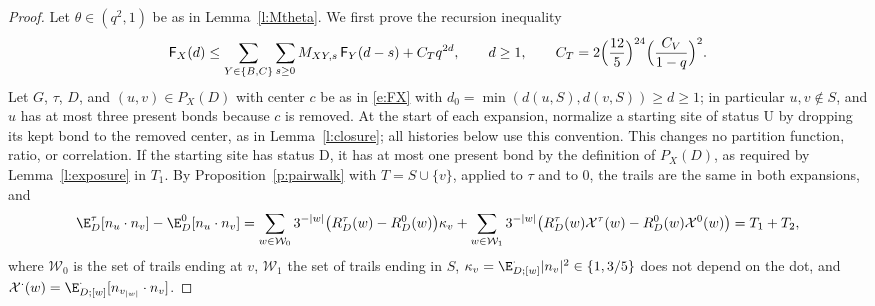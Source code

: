 \begin{proof}
Let $\theta \in (q^2, 1)$ be as in Lemma~\ref{l:Mtheta}. We first prove the recursion inequality
\begin{equation}\label{e:recineq}
\mathsf F_X(d) \le \sum_{Y \in \{B, C\}} \sum_{s \ge 0} M_{XY, s} \, \mathsf F_Y(d - s) + C_T q^{2d}, \qquad d \ge 1, \qquad C_T = 2 \Bigl( \frac{12}{5} \Bigr)^{24} \Bigl( \frac{C_V}{1 - q} \Bigr)^2 .
\end{equation}
Let $G$, $\tau$, $D$, and $(u, v) \in P_X(D)$ with center $c$ be as in \eqref{e:FX} with $d_0 = \min(d(u, S), d(v, S)) \ge d \ge 1$; in particular $u, v \notin S$, and $u$ has at most three present bonds because $c$ is removed. At the start of each expansion, normalize a starting site of status $\mathrm U$ by dropping its kept bond to the removed center, as in Lemma~\ref{l:closure}; all histories below use this convention. This changes no partition function, ratio, or correlation. If the starting site has status $\mathrm D$, it has at most one present bond by the definition of $P_X(D)$, as required by Lemma~\ref{l:exposure} in $T_1$. By Proposition~\ref{p:pairwalk} with $T = S \cup \{v\}$, applied to $\tau$ and to $0$, the trails are the same in both expansions, and
\begin{equation*}
\E^\tau_D[n_u \cdot n_v] - \E^0_D[n_u \cdot n_v] = \sum_{w \in \mathcal W_0} 3^{-|w|} \bigl( R^\tau_D(w) - R^0_D(w) \bigr) \kappa_v + \sum_{w \in \mathcal W_1} 3^{-|w|} \bigl( R^\tau_D(w) \mathcal X^\tau(w) - R^0_D(w) \mathcal X^0(w) \bigr) = T_1 + T_2,
\end{equation*}
where $\mathcal W_0$ is the set of trails ending at $v$, $\mathcal W_1$ the set of trails ending in $S$, $\kappa_v = \E^\cdot_{D;[w]}|n_v|^2 \in \{1, 3/5\}$ does not depend on the dot, and $\mathcal X^\cdot(w) = \E^\cdot_{D;[w]}[n_{v_{|w|}} \cdot n_v]$.


\end{proof}
